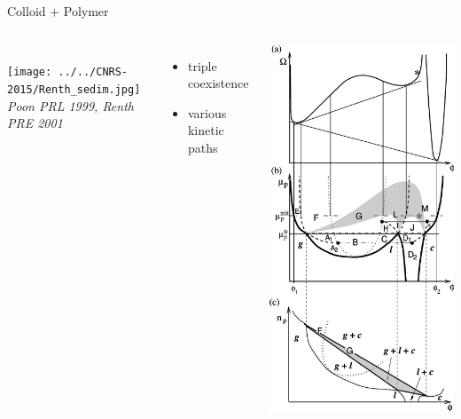 \documentclass[xcolor=table]{beamer}
\begin{document}
\begin{frame}{Colloid + Polymer}
\begin{columns}
\\

	\bigskip
	\texttt{[image: ../../CNRS-2015/Renth\_sedim.jpg]}\\
	\textit{\footnotesize Poon PRL 1999, Renth PRE 2001}
	\begin{itemize}
	\item triple coexistence
	\item various kinetic paths
	\end{itemize}

	\includegraphics[width=\textwidth,clip=true,trim=0 0 0 4.5cm]{Renth_diag.pdf}
	\end{columns}
\end{frame}
\end{document}
